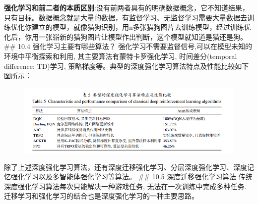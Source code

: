 \textbf{强化学习和前二者的本质区别}:没有前两者具有的明确数据概念，它不知道结果，只有目标。数据概念就是大量的数据，有监督学习、无监督学习需要大量数据去训练优化你建立的模型，就像猫狗识别，用n多张猫狗图片去训练模型，经过训练优化后，你用一张崭新的猫狗图片让模型作出判断，这个模型就知道是猫还是狗。
\#\# 10.4 强化学习主要有哪些算法？
强化学习不需要监督信号,可以在模型未知的环境中平衡探索和利用,
其主要算法有蒙特卡罗强化学习, 时间差分(temporal difference: TD)学习,
策略梯度等。典型的深度强化学习算法特点及性能比较如下图所示：

\begin{figure}
\centering
\includegraphics{./img/ch10/10-4.png}
\caption{}
\end{figure}

除了上述深度强化学习算法，还有深度迁移强化学习、分层深度强化学习、深度记忆强化学习以及多智能体强化学习等算法。
\#\# 10.5 深度迁移强化学习算法
传统深度强化学习算法每次只能解决一种游戏任务,
无法在一次训练中完成多种任务.
迁移学习和强化学习的结合也是深度强化学习的一种主要思路。

